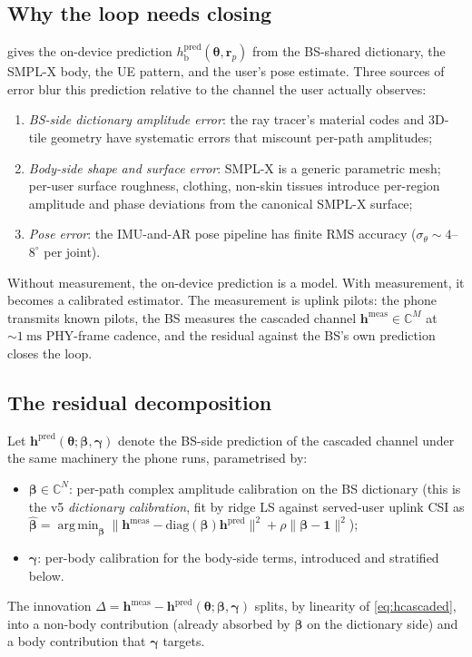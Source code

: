 \documentclass[11pt,a4paper]{article}
\theoremstyle{definition}
\newcommand{\rr}{\mathbf{r}}
\DeclareMathOperator*{\argmin}{arg\,min}
\newcommand{\Complex}{\mathbb{C}}
\newcommand{\hh}{\mathbf{h}}
\newcommand{\thetab}{\bm{\theta}}
\newcommand{\hbody}{h_{\mathrm{b}}}
\begin{document}
\subsection{Why the loop needs closing}

 gives the on-device prediction $\hbody^{\mathrm{pred}}(\thetab,\rr_p)$
from the BS-shared dictionary, the SMPL-X body, the UE pattern, and
the user's pose estimate.  Three sources of error blur this
prediction relative to the channel the user actually observes:
\begin{enumerate}[leftmargin=1.6em,itemsep=2pt]
\item \emph{BS-side dictionary amplitude error}: the ray tracer's
material codes and 3D-tile geometry have systematic errors that
miscount per-path amplitudes;
\item \emph{Body-side shape and surface error}: SMPL-X is a
generic parametric mesh; per-user surface roughness, clothing,
non-skin tissues introduce per-region amplitude and phase
deviations from the canonical SMPL-X surface;
\item \emph{Pose error}: the IMU-and-AR pose pipeline has finite
RMS accuracy ($\sigma_\theta\sim 4$--$8^\circ$ per joint).
\end{enumerate}
Without measurement, the on-device prediction is a model.  With
measurement, it becomes a calibrated estimator.  The measurement
is uplink pilots: the phone transmits known pilots, the BS
measures the cascaded channel
$\hh^{\mathrm{meas}}\in\Complex^M$ at $\sim\SI{1}{\milli\second}$
PHY-frame cadence, and the residual against the BS's own
prediction closes the loop.

\subsection{The residual decomposition}

Let $\hh^{\mathrm{pred}}(\thetab;\bm\beta,\bm\gamma)$ denote the
BS-side prediction of the cascaded channel under the same
machinery the phone runs, parametrised by:
\begin{itemize}[leftmargin=1.6em,itemsep=2pt]
\item $\bm\beta\in\Complex^N$: per-path complex amplitude
calibration on the BS dictionary
(this is the v5 \emph{dictionary calibration}, fit by ridge LS
against served-user uplink CSI as
$\hat{\bm\beta}=\argmin_{\bm\beta}\|\hh^{\mathrm{meas}}-
\mathrm{diag}(\bm\beta)\hh^{\mathrm{pred}}\|^2+\rho\|\bm\beta-\mathbf{1}\|^2$);
\item $\bm\gamma$: per-body calibration for the body-side terms,
introduced and stratified below.
\end{itemize}
The innovation
\(
  \Delta = \hh^{\mathrm{meas}} - \hh^{\mathrm{pred}}(\thetab;\bm\beta,\bm\gamma)
\)
splits, by linearity of \cref{eq:hcascaded}, into a non-body
contribution (already absorbed by $\bm\beta$ on the dictionary
side) and a body contribution that $\bm\gamma$ targets.
\end{document}
